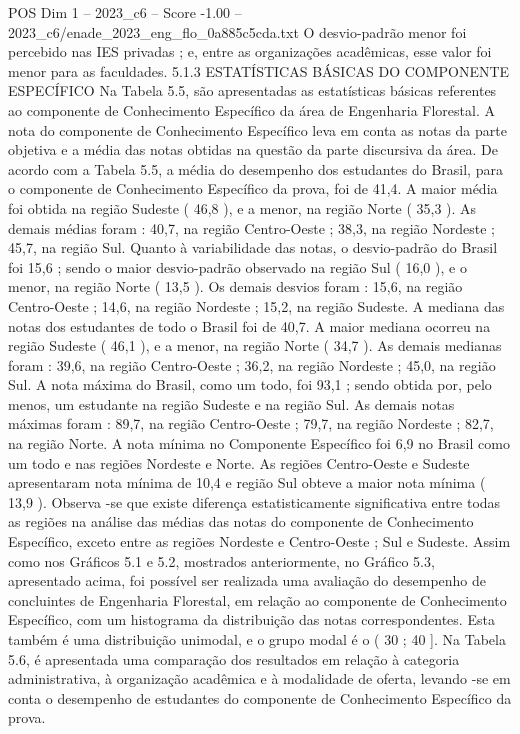 \begin{textsample}{POS Dim 1 – 2023\_c6 – Score -1.00 – 2023\_c6/enade\_2023\_eng\_flo\_0a885c5cda.txt}
O desvio-padrão menor foi percebido nas IES privadas ; e, entre as organizações acadêmicas, esse valor foi menor para as faculdades. 5.1.3 ESTATÍSTICAS BÁSICAS DO COMPONENTE ESPECÍFICO Na Tabela 5.5, são apresentadas as estatísticas básicas referentes ao componente de Conhecimento Específico da área de Engenharia Florestal.
A nota do componente de Conhecimento Específico leva em conta as notas da parte objetiva e a média das notas obtidas na questão da parte discursiva da área.
De acordo com a Tabela 5.5, a média do desempenho dos estudantes do Brasil, para o componente de Conhecimento Específico da prova, foi de 41,4.
A maior média foi obtida na região Sudeste ( 46,8 ), e a menor, na região Norte ( 35,3 ).
As demais médias foram : 40,7, na região Centro-Oeste ; 38,3, na região Nordeste ; 45,7, na região Sul.
Quanto à variabilidade das notas, o desvio-padrão do Brasil foi 15,6 ; sendo o maior desvio-padrão observado na região Sul ( 16,0 ), e o menor, na região Norte ( 13,5 ).
Os demais desvios foram : 15,6, na região Centro-Oeste ; 14,6, na região Nordeste ; 15,2, na região Sudeste.
A mediana das notas dos estudantes de todo o Brasil foi de 40,7.
A maior mediana ocorreu na região Sudeste ( 46,1 ), e a menor, na região Norte ( 34,7 ).
As demais medianas foram : 39,6, na região Centro-Oeste ; 36,2, na região Nordeste ; 45,0, na região Sul.
A nota máxima do Brasil, como um todo, foi 93,1 ; sendo obtida por, pelo menos, um estudante na região Sudeste e na região Sul.
As demais notas máximas foram : 89,7, na região Centro-Oeste ; 79,7, na região Nordeste ; 82,7, na região Norte.
A nota mínima no Componente Específico foi 6,9 no Brasil como um todo e nas regiões Nordeste e Norte.
As regiões Centro-Oeste e Sudeste apresentaram nota mínima de 10,4 e região Sul obteve a maior nota mínima ( 13,9 ).
Observa -se que existe diferença estatisticamente significativa entre todas as regiões na análise das médias das notas do componente de Conhecimento Específico, exceto entre as regiões Nordeste e Centro-Oeste ; Sul e Sudeste.
Assim como nos Gráficos 5.1 e 5.2, mostrados anteriormente, no Gráfico 5.3, apresentado acima, foi possível ser realizada uma avaliação do desempenho de concluintes de Engenharia Florestal, em relação ao componente de Conhecimento Específico, com um histograma da distribuição das notas correspondentes.
Esta também é uma distribuição unimodal, e o grupo modal é o ( 30 ; 40 ].
Na Tabela 5.6, é apresentada uma comparação dos resultados em relação à categoria administrativa, à organização acadêmica e à modalidade de oferta, levando -se em conta o desempenho de estudantes do componente de Conhecimento Específico da prova.

\end{textsample}

